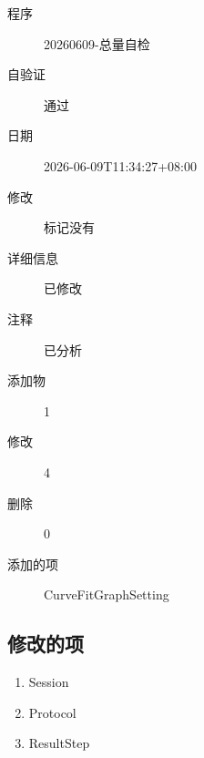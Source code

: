 \documentclass[UTF8,10pt,a4paper,fontset=fandol]{ctexart}
\newcommand{\fieldvalue}[1]{#1}
\begin{document}
\begin{description}
    \item[程序]%
    \fieldvalue{20260609-总量自检}

    \item[自验证]%
    \fieldvalue{通过}

    \item[日期]%
    \fieldvalue{2026-06-09T11:34:27+08:00}

    \item[修改]%
    \fieldvalue{标记没有}

    \item[详细信息]%
    \fieldvalue{已修改}

    \item[注释]%
    \fieldvalue{已分析}

    \item[添加物]%
    \fieldvalue{1}

    \item[修改]%
    \fieldvalue{4}

    \item[删除]%
    \fieldvalue{0}

    \item[添加的项]%
    \fieldvalue{CurveFitGraphSetting}
\end{description}

\subsection*{修改的项}

\begin{enumerate}
    \item \fieldvalue{Session}
    \item \fieldvalue{Protocol}
    \item \fieldvalue{ResultStep}
\end{enumerate}
\end{document}
